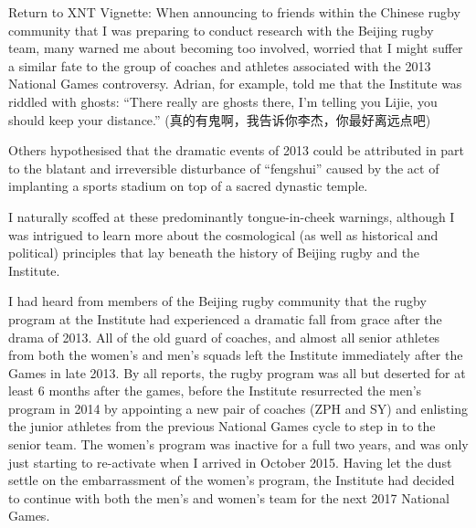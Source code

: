 Return to XNT Vignette:
When announcing to friends within the Chinese rugby community that I was preparing to conduct research with the Beijing rugby team, many warned me about becoming too involved, worried that I might suffer a similar fate to the group of coaches and athletes associated with the 2013 National Games controversy.  Adrian, for example, told me that the Institute was riddled with ghosts: ``There really are ghosts there, I'm telling you Lijie, you should keep your distance.'' (真的有鬼啊，我告诉你李杰，你最好离远点吧)

  Others hypothesised that the dramatic events of 2013 could be attributed in part to the blatant and irreversible disturbance of ``fengshui'' caused by the act of implanting a sports stadium on top of a sacred dynastic temple.

I naturally scoffed at these predominantly tongue-in-cheek warnings, although I was intrigued to learn more about the cosmological (as well as historical and political) principles that lay beneath the history of Beijing rugby and the Institute.

I had heard from members of the Beijing rugby community that the rugby program at the Institute had experienced a dramatic fall from grace after the drama of 2013.  All of the old guard of coaches, and almost all senior athletes from both the women's and men's squads left the Institute immediately after the Games in late 2013.  By all reports, the rugby program was all but deserted for at least 6 months after the games, before the Institute resurrected the men's program in 2014 by appointing a new pair of coaches (ZPH and SY) and enlisting the junior athletes from the previous National Games cycle to step in to the senior team.  The women's program was inactive for a full two years, and was only just starting to re-activate when I arrived in October 2015.  Having let the dust settle on the embarrassment of the women's program, the Institute had decided to continue with both the men's and women's team for the next 2017 National Games.


